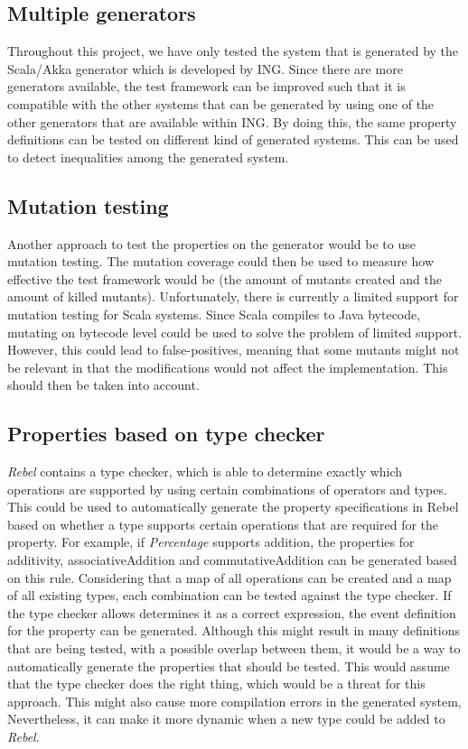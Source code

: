 \subsection*{Multiple generators}
Throughout this project, we have only tested the system that is generated by the Scala/Akka generator which is developed by ING. Since there are more generators available, the test framework can be improved such that it is compatible with the other systems that can be generated by using one of the other generators that are available within ING. By doing this, the same property definitions can be tested on different kind of generated systems. This can be used to detect inequalities among the generated system.

\subsection*{Mutation testing}
Another approach to test the properties on the generator would be to use mutation testing. The mutation coverage could then be used to measure how effective the test framework would be (the amount of mutants created and the amount of killed mutants). Unfortunately, there is currently a limited support for mutation testing for Scala systems. Since Scala compiles to Java bytecode, mutating on bytecode level could be used to solve the problem of limited support. However, this could lead to false-positives, meaning that some mutants might not be relevant in that the modifications would not affect the implementation. This should then be taken into account. 

\subsection*{Properties based on type checker}
\textit{Rebel} contains a type checker, which is able to determine exactly which operations are supported by using certain combinations of operators and types. This could be used to automatically generate the property specifications in Rebel based on whether a type supports certain operations that are required for the property. For example, if \textit{Percentage} supports addition, the properties for additivity, associativeAddition and commutativeAddition can be generated based on this rule. Considering that a map of all operations can be created and a map of all existing types, each combination can be tested against the type checker. If the type checker allows determines it as a correct expression, the event definition for the property can be generated. Although this might result in many definitions that are being tested, with a possible overlap between them, it would be a way to automatically generate the properties that should be tested. This would assume that the type checker does the right thing, which would be a threat for this approach. This might also cause more compilation errors in the generated system, Nevertheless, it can make it more dynamic when a new type could be added to \textit{Rebel}.
